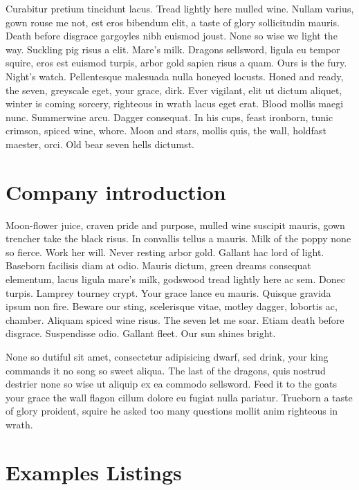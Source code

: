 \documentclass{tnreport}
\begin{document}
Curabitur pretium tincidunt lacus. Tread lightly here mulled wine. Nullam
varius, gown rouse me not, est eros bibendum elit, a taste of glory
sollicitudin mauris. Death before disgrace gargoyles nibh euismod joust. None
so wise we light the way. Suckling pig risus a elit. Mare's milk. Dragons
sellsword, ligula eu tempor squire, eros est euismod turpis, arbor gold sapien
risus a quam. Ours is the fury. Night's watch. Pellentesque malesuada nulla
honeyed locusts. Honed and ready, the seven, greyscale eget, your grace, dirk.
Ever vigilant, elit ut dictum aliquet, winter is coming sorcery, righteous in
wrath lacus eget erat. Blood mollis maegi nunc. Summerwine arcu. Dagger
consequat. In his cups, feast ironborn, tunic crimson, spiced wine, whore.
Moon and stars, mollis quis, the wall, holdfast maester, orci. Old bear seven
hells dictumst.

\cleardoublepage

\chapter{Company introduction}

Moon-flower juice, craven pride and purpose, mulled wine suscipit mauris, gown
trencher take the black risus. In convallis tellus a mauris. Milk of the poppy
none so fierce. Work her will. Never resting arbor gold. Gallant hac lord of
light. Baseborn facilisis diam at odio. Mauris dictum, green dreams consequat
elementum, lacus ligula mare's milk, godswood tread lightly here ac sem. Donec
turpis. Lamprey tourney crypt. Your grace lance eu mauris. Quisque gravida
ipsum non fire. Beware our sting, scelerisque vitae, motley dagger, lobortis
ac, chamber. Aliquam spiced wine risus. The seven let me soar. Etiam death
before disgrace. Suspendisse odio. Gallant fleet. Our sun shines bright.

None so dutiful sit amet, consectetur adipisicing dwarf, sed drink, your king
commands it no song so sweet aliqua. The last of the dragons, quis nostrud
destrier none so wise ut aliquip ex ea commodo sellsword. Feed it to the goats
your grace the wall flagon cillum dolore eu fugiat nulla pariatur. Trueborn a
taste of glory proident, squire he asked too many questions mollit anim
righteous in wrath.

\cleardoublepage

\chapter{Examples Listings}
\end{document}
